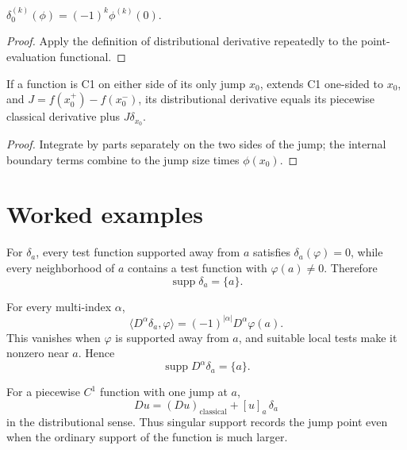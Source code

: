 \begin{theorem}\label{thm:iii17-02}
$\delta_0^{(k)}(\phi)=(-1)^k\phi^{(k)}(0)$.
\begin{proof}
Apply the definition of distributional derivative repeatedly to the point-evaluation functional.
\end{proof}
\end{theorem}

\begin{theorem}\label{thm:iii17-03}
If a function is C1 on either side of its only jump $x_0$, extends C1 one-sided to $x_0$, and $J=f(x_0^+)-f(x_0^-)$, its distributional derivative equals its piecewise classical derivative plus $J\delta_{x_0}$.
\begin{proof}
Integrate by parts separately on the two sides of the jump; the internal boundary terms combine to the jump size times $\phi(x_0)$.
\end{proof}
\end{theorem}

\section{Worked examples}

\begin{example}\label{ex:iii17-worked-01}
For \(\delta_a\), every test function supported away from \(a\) satisfies
\(\delta_a(\varphi)=0\), while every neighborhood of \(a\) contains a test
function with \(\varphi(a)\ne0\). Therefore
\[
\operatorname{supp}\delta_a=\{a\}.
\]
\end{example}

\begin{example}\label{ex:iii17-worked-02}
For every multi-index \(\alpha\),
\[
\langle D^\alpha\delta_a,\varphi\rangle
=(-1)^{|\alpha|}D^\alpha\varphi(a).
\]
This vanishes when \(\varphi\) is supported away from \(a\), and suitable local
tests make it nonzero near \(a\). Hence
\[
\operatorname{supp}D^\alpha\delta_a=\{a\}.
\]
\end{example}

\begin{example}\label{ex:iii17-worked-03}
For a piecewise \(C^1\) function with one jump at \(a\),
\[
Du=(Du)_{\mathrm{classical}}+
[u]_a\,\delta_a
\]
in the distributional sense. Thus singular support records the jump point even
when the ordinary support of the function is much larger.
\end{example}

